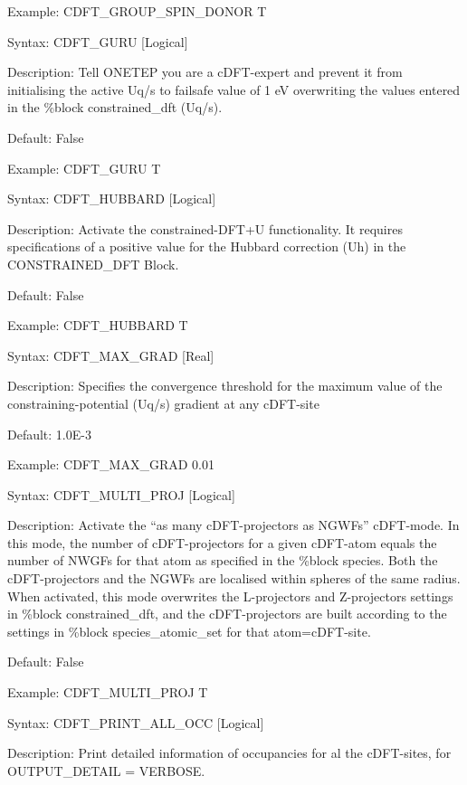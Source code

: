 \documentclass[letterpaper,10pt,english]{sphinxmanual}
\begin{document}
Example: CDFT\_GROUP\_SPIN\_DONOR T


Syntax: CDFT\_GURU {[}Logical{]}

Description: Tell ONETEP you are a cDFT-expert and prevent it from
initialising the active \textbar{}Uq/s\textbar{} to failsafe value of 1 eV overwriting
the values entered in the \%block constrained\_dft (Uq/s).

Default: False

Example: CDFT\_GURU T


Syntax: CDFT\_HUBBARD {[}Logical{]}

Description: Activate the constrained-DFT+U functionality. It requires
specifications of a positive value for the Hubbard correction (Uh) in
the CONSTRAINED\_DFT Block.

Default: False

Example: CDFT\_HUBBARD T


Syntax: CDFT\_MAX\_GRAD {[}Real{]}

Description: Specifies the convergence threshold for the maximum value
of the constraining-potential (Uq/s) gradient at any cDFT-site

Default: 1.0E-3

Example: CDFT\_MAX\_GRAD 0.01


Syntax: CDFT\_MULTI\_PROJ {[}Logical{]}

Description: Activate the “as many cDFT-projectors as NGWFs” cDFT-mode.
In this mode, the number of cDFT-projectors for a given cDFT-atom equals
the number of NWGFs for that atom as specified in the \%block species.
Both the cDFT-projectors and the NGWFs are localised within spheres of
the same radius. When activated, this mode overwrites the L-projectors
and Z-projectors settings in \%block constrained\_dft, and the
cDFT-projectors are built according to the settings in \%block
species\_atomic\_set for that atom=cDFT-site.

Default: False

Example: CDFT\_MULTI\_PROJ T


Syntax: CDFT\_PRINT\_ALL\_OCC {[}Logical{]}

Description: Print detailed information of occupancies for al the
cDFT-sites, for OUTPUT\_DETAIL = VERBOSE.
\end{document}

